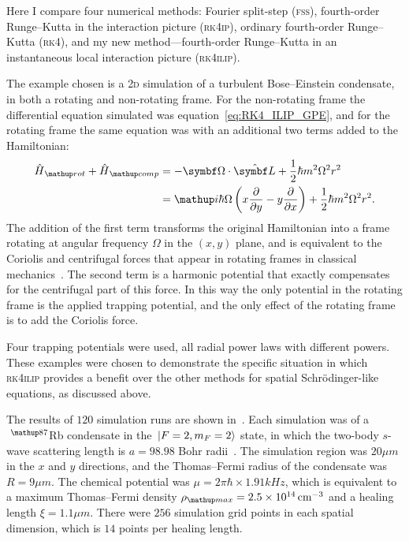  Here I compare four numerical methods: Fourier split-step (\textsc{fss}), fourth-order Runge--Kutta in the interaction picture (\textsc{rk4ip}), ordinary fourth-order Runge--Kutta (\textsc{rk4}), and my new method---fourth-order Runge--Kutta in an instantaneous local interaction picture (\textsc{rk4ilip}).

 The example chosen is a \textsc{2d} simulation of a turbulent Bose--Einstein condensate, in both a rotating and non-rotating frame. For the non-rotating frame the differential equation simulated was equation~\eqref{eq:RK4_ILIP_GPE}, and for the rotating frame the same equation was with an additional two terms added to the Hamiltonian:
\begin{align}
\hat H_\up{rot} + \hat H_\up {comp} &= -\vec \Omega \cdot \hat{\vec L} +\frac12\hbar m^2\Omega^2 r^2\\
                &= \ii\hbar\Omega \left(x\pdv{y} - y\pdv{x}\right) +\frac12\hbar m^2\Omega^2 r^2.
\end{align}
The addition of the first term transforms the original Hamiltonian into a frame rotating at angular frequency $\Omega$ in the $(x, y)$ plane, and is equivalent to the Coriolis and centrifugal forces that appear in rotating frames in classical mechanics~\cite{Gulshani1978}. The second term is a harmonic potential that exactly compensates for the centrifugal part of this force. In this way the only potential in the rotating frame is the applied trapping potential, and the only effect of the rotating frame is to add the Coriolis force.

 Four trapping potentials were used, all radial power laws with different powers. These examples were chosen to demonstrate the specific situation in which \textsc{rk4ilip} provides a benefit over the other methods for spatial Schr\"odinger-like equations, as discussed above.

The results of $120$ simulation runs are shown in~. Each simulation was of a $\ ^\up{87}$Rb condensate in the $\ket{F=2, m_F=2}$ state, in which the two-body $s$-wave scattering length is $a = 98.98$ Bohr radii~\cite{vanKempen2002}. The simulation region was $20\unit{\mu m}$ in the $x$ and $y$ directions, and the Thomas--Fermi radius of the condensate was $R = 9\unit{\mu m}$.  The chemical potential was $\mu = 2\pi\hbar\times 1.91\unit{kHz}$, which is equivalent to a maximum Thomas--Fermi density $\rho_\up{max} = 2.5\E{14}\unit{cm}^{-3}$ and a healing length $\xi = 1.1\unit{\mu m}$. There were $256$ simulation grid points in each spatial dimension, which is $14$ points per healing length.

